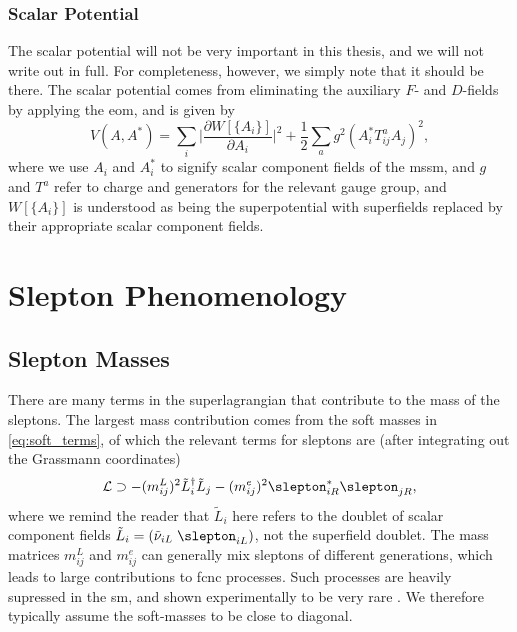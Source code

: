 \subsubsection{Scalar Potential}

The scalar potential will not be very important in this thesis, and we will not write out in full. For completeness, however, we simply note that it should be there.
The scalar potential comes from eliminating the auxiliary $F$- and $D$-fields by applying the \gls{eom}, and is given by
\begin{equation}
    V(A,A^*) = \sum_i \biggl\vert \frac{\partial W[\{A_i\}]}{\partial A_i} \biggr\vert^2 + \frac{1}{2}\sum_a g^2 (A_i^* T_{ij}^a A_j)^2,
\end{equation}
where we use $A_i$ and $A_i^*$ to signify scalar component fields of the \gls{mssm}, and $g$ and $T^a$ refer to charge and generators for the relevant gauge group, and $W[\{A_i\}]$ is understood as being the superpotential with superfields replaced by their appropriate scalar component fields.




\section{Slepton Phenomenology}\label{sec:slepton_pheno}

\subsection{Slepton Masses}\label{sec:slepton_masses}

There are many terms in the superlagrangian that contribute to the mass of the sleptons. The largest mass contribution comes from the soft masses in \cref{eq:soft_terms}, of which the relevant terms for sleptons are (after integrating out the Grassmann coordinates)
\begin{equation}
\mathcal{L} \supset -(m_{ij}^L)^2 \tilde{L}_i^\dagger\tilde{L}_j - (m_{ij}^e)^2\slepton_{iR}^*\slepton_{jR},
\end{equation}
where we remind the reader that $\tilde{L}_i$ here refers to the doublet of scalar component fields $\tilde{L}_i = (\tilde\nu_{iL}\;\slepton_{iL})$, not the superfield doublet.
The mass matrices $m_{ij}^L$ and $m_{ij}^e$ can generally mix sleptons of different generations, which leads to large contributions to \gls{fcnc} processes.
Such processes are heavily supressed in the \gls{sm}, and shown experimentally to be very rare .
We therefore typically assume the soft-masses to be close to diagonal.

